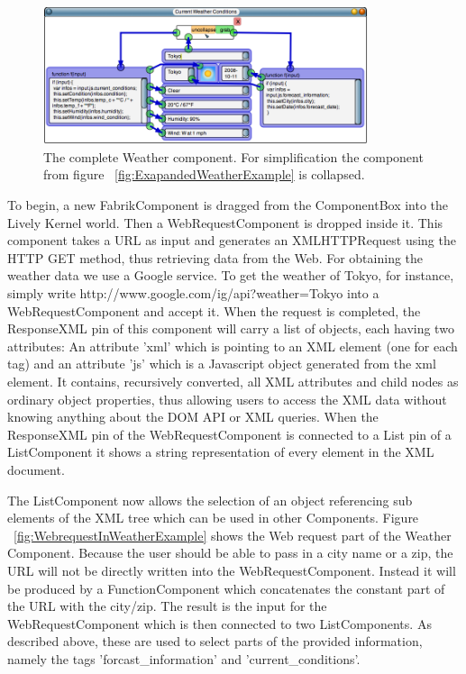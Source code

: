 \documentclass[pdftex, times, 10pt, twocolumn]{article}
\begin{document}
\begin{figure}[]\centering
\includegraphics[width=0.850000\textwidth]{weatherExample07.png} 

\caption{The complete Weather component. For simplification the component from figure ~\ref{fig:ExapandedWeatherExample} is collapsed. }
\label{fig:ExapandedSimplifiedWeatherExample}
\end{figure}
To begin, a new FabrikComponent is dragged from the ComponentBox into the Lively Kernel world. Then a WebRequestComponent is dropped inside it. This component takes a URL as input and generates an XMLHTTPRequest using the HTTP GET method, thus retrieving data from the Web. For obtaining the weather data we use a Google service. To get the weather of Tokyo, for instance, simply write http://www.google.com/ig/api?weather=Tokyo into a WebRequestComponent and accept it. When the request is completed, the ResponseXML pin of this component will carry a list of objects, each having two attributes: An attribute 'xml' which is pointing to an XML element (one for each tag) and an attribute 'js' which is a Javascript object generated from the xml element. It contains, recursively converted, all XML attributes and child nodes as ordinary object properties, thus allowing users to access the XML data without knowing anything about the DOM API or XML queries. When the ResponseXML pin of the WebRequestComponent is connected to a List pin of a ListComponent it shows a string representation of every element in the XML document. 

The ListComponent now allows the selection of an object referencing sub elements of the XML tree which can be used in other Components. Figure ~\ref{fig:WebrequestInWeatherExample} shows the Web request part of the Weather Component. Because the user should be able to pass in a city name or a zip, the URL will not be directly written into the WebRequestComponent. Instead it will be produced by a FunctionComponent which concatenates the constant part of the URL with the city/zip. The result is the input for the WebRequestComponent which is then connected to two ListComponents. As described above, these are used to select parts of the provided information, namely the tags 'forcast\_information' and 'current\_conditions'. 
\end{document}
